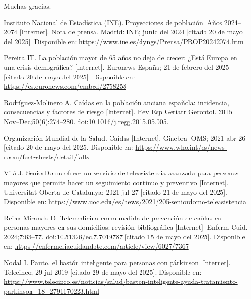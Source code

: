 \documentclass[12pt, a4paper]{article}
\begin{document}
\vspace{1em}

Muchas gracias.

\begin{thebibliography}{9}
	
	
	Instituto Nacional de Estadística (INE). Proyecciones de población. Años 2024–2074 [Internet]. Nota de prensa. Madrid: INE; junio del 2024  [citado 20 de mayo del 2025]. Disponible en: \url{https://www.ine.es/dyngs/Prensa/PROP20242074.htm}
	
	Pereira IT. La población mayor de 65 años no deja de crecer: ¿Está Europa en una crisis demográfica? [Internet]. Euronews España; 21 de febrero del 2025 [citado 20 de mayo del 2025]. Disponible en: \url{https://es.euronews.com/embed/2758258}
	
	Rodríguez-Molinero A.  
	Caídas en la población anciana española: incidencia, consecuencias y factores de riesgo [Internet].  
	Rev Esp Geriatr Gerontol. 2015 Nov–Dec;50(6):274–280.  
	doi:10.1016/j.regg.2015.05.005.

	Organización Mundial de la Salud. Caídas [Internet]. Ginebra: OMS; 2021 abr 26 [citado 20 de mayo del 2025. Disponible en: \url{https://www.who.int/es/news-room/fact-sheets/detail/falls}
		
	Vilá J. SeniorDomo ofrece un servicio de teleasistencia avanzada para personas mayores que permite hacer un seguimiento continuo y preventivo [Internet]. Universitat Oberta de Catalunya; 2021 jul 27 [citado 21 de mayo del 2025]. Disponible en: \url{https://www.uoc.edu/es/news/2021/205-seniordomo-teleasistencia}

	
	Reina Miranda D. Telemedicina como medida de prevención de caídas en personas mayores en sus domicilios: revisión bibliográfica [Internet]. Enferm Cuid. 2024;7:63–77. doi:10.51326/ec.7.7019787 [citado 15 de mayo del 2025]. Disponible en: \url{https://enfermeriacuidandote.com/article/view/6027/7367}
	
	
	Nodal I. Pauto. el bastón inteligente para personas con párkinson [Internet]. Telecinco; 29 jul 2019 [citado 29 de mayo del 2025]. Disponible en: \url{https://www.telecinco.es/noticias/salud/baston-inteligente-ayuda-tratamiento-parkinson_18_2791170223.html}
	

\end{thebibliography}
\end{document}
